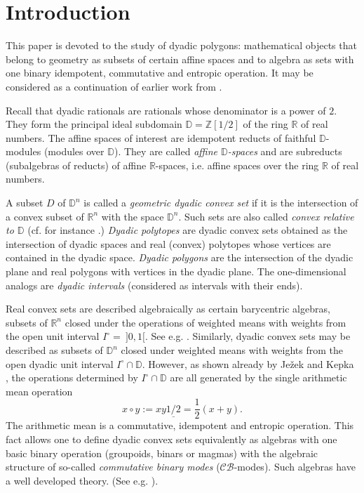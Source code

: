 \documentclass[12pt]{amsart}
\def\mbR{\mathbb{R}}
\def\mbZ{\mathbb{Z}}
\def\mbD{\mathbb{D}}
\newcommand{\mc}{\mathcal}
\theoremstyle{plain}
\theoremstyle{definition}
\numberwithin{equation}{section}
\begin{document}



\section{Introduction}


This paper is devoted to the study of dyadic polygons: mathematical objects that belong to geometry as subsets of certain affine spaces and to algebra as sets with one binary  idempotent, commutative and entropic operation. It may be considered as a continuation of earlier work from \cite{MRS11}.

Recall that dyadic rationals are rationals whose denominator is a power of $2$. They form the
principal ideal subdomain $\mbD = \mbZ[1/2]$ of the ring $\mbR$ of real numbers. The affine
spaces of interest are idempotent reducts of faithful $\mbD$-modules (modules over
$\mbD$). They are called \emph{affine $\mbD$-spaces} and are subreducts (subalgebras of reducts) of affine $\mbR$-spaces, i.e. affine spaces over the ring $\mbR$ of real numbers.

A subset $D$ of $\mbD^n$ is called a \emph{geometric dyadic convex set}
if it is the intersection of a convex subset of $\mbR^n$ with the space $\mbD^n$. Such sets are also called \emph{convex relative to $\mbD$} (cf. for instance \cite{B05}.) \emph{Dyadic polytopes} are dyadic convex sets obtained as the intersection of dyadic spaces and real (convex) polytopes whose vertices are contained in the dyadic space. \emph{Dyadic polygons} are the intersection of the dyadic
plane and real polygons with vertices in the dyadic plane. The one-dimensional analogs are
\emph{dyadic intervals} (considered as intervals with their ends).

Real convex sets are described algebraically as certain barycentric algebras, subsets of
$\mbR^n$ closed under the operations of weighted means with weights from the open unit interval
$I^{\circ}=\ ]0,1[$. See e.g. \cite{RS85, RS02}. Similarly, dyadic convex sets may be described as subsets of $\mbD^n$
closed under weighted means with weights from the open dyadic unit interval $I^{\circ} \cap
\mbD$. However, as shown already by Je\v{z}ek and Kepka \cite{JK76}, the
operations determined by $I^{\circ} \cap \mbD$ are all generated by the single arithmetic mean
operation
\[
x \circ y := xy \underline{1/2} = \frac{1}{2}(x + y).
\]
The arithmetic mean is a commutative, idempotent and entropic operation.
This fact allows one to define dyadic convex sets equivalently as algebras with one basic binary operation (groupoids, binars or magmas) with the algebraic structure of so-called \emph{commutative binary modes}
($\mc{CB}$-modes). Such algebras have a well developed theory. (See e.g. \cite{JK75, JK76, JK83, MMR19, MMR19a,
MMR23, MR04, MRS11, MR16, RS85, RS02}).
\end{document}
